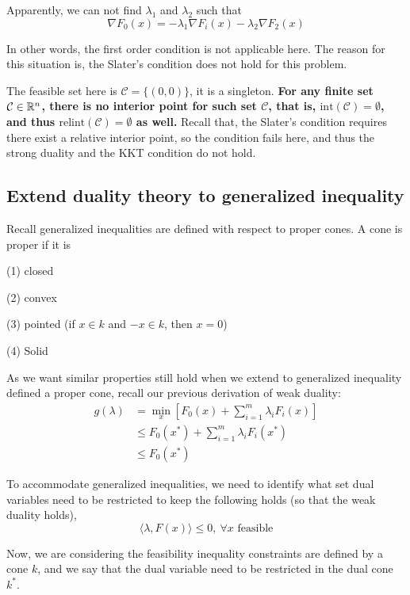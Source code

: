 \begin{example}
Apparently, we can not find $\lambda_1$ and $\lambda_2$ such that 
$$\nabla F_0(x) =-\lambda_1\nabla F_i(x) -\lambda_2 \nabla F_2(x) $$

In other words, the first order condition is not applicable here. The reason for this situation is, the Slater's condition does not hold for this problem.

The feasible set here is $\mathcal{C}=\{(0, 0)\}$, it is a singleton. \textbf{For any finite set $\mathcal{C}\in\mathbb{R}^{n}$, there is no interior point for such set $\mathcal{C}$, that is, $\text{int}(\mathcal{C}) =\emptyset$, and thus $\text{relint}(\mathcal{C}) =\emptyset$ as well.} Recall that, the Slater's condition requires there exist a relative interior point, so the condition fails here, and thus the strong duality and the KKT condition do not hold.


\end{example}


\subsection{Extend duality theory to generalized inequality}
Recall generalized inequalities are defined with respect to proper cones. A cone is proper if it is

	(1) closed
	
	(2) convex
	
	(3) pointed (if $x\in k$ and $-x\in k$, then $x=0$)
	
	(4) Solid


\vspace{0.3cm}
As we want similar properties still hold when we extend to generalized inequality defined a proper cone, recall our previous derivation of weak duality:
\begin{align*}
g(\lambda) &= \min_x[F_0(x) + \sum^m_{i=1}\lambda_iF_i(x)]\\
&\leq F_0(x^*) + \sum^m_{i=1}\lambda_i F_i(x^*) \\
&\leq F_0(x^*)
\end{align*}

To accommodate generalized inequalities, we need to identify what set dual variables need to be restricted to keep the following holds (so that the weak duality holds),
\begin{equation*}
\langle \lambda, F(x)\rangle\leq 0,\ \forall x \text{ feasible}
\end{equation*}

Now, we are considering the feasibility inequality constraints are defined by a cone $k$, and we say that the dual variable need to be restricted in the dual cone $k^*$.
	
